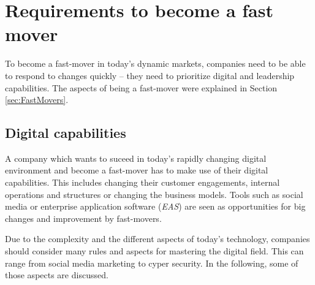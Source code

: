 \documentclass[a4]{scrartcl}
\newenvironment{CountingDefinition}[2][]{%
	\ifstrempty{#1}%
	{\mdfsetup{%
			frametitle={{\strut ~}}}
	}%
	{\mdfsetup{%
			frametitle={{\strut ~#1}}}%
	}%
	\mdfsetup{
		nobreak                   = true,
		linecolor                 = gray,
		frametitlebackgroundcolor = gray!50,
		style                     = enviStyle
	}
	\begin{mdframed}[]\relax%
		\label{#2}}{\end{mdframed}}
\begin{document}
	
	
	
	
	
	
	
	
	\section{Requirements to become a fast mover} \label{sec:ReqFastMovers}
	
	
	To become a fast-mover in today's dynamic markets, companies need to be able to respond to changes quickly -- they need to prioritize digital and leadership capabilities. The aspects of being a fast-mover were explained in Section \ref{sec:FastMovers}.
	
	
	

	
	
	
	
	
	
	\subsection{Digital capabilities} \label{subsec:digitalcapabilities}
	
	A company which wants to suceed in today's rapidly changing digital environment and become a fast-mover %
	has to make use of their digital capabilities. This includes changing their customer engagements, internal operations and structures or changing the business models. Tools such as social media or enterprise application software (\textit{EAS}) are seen as opportunities for big changes and improvement by fast-movers.~\cite{leadingdigital}
	
	Due to the complexity and the different aspects of today's technology, companies should consider many rules and aspects for mastering the digital field. This can range from social media marketing to cyper security. In the following, some of those aspects are discussed.
	
\end{document}

